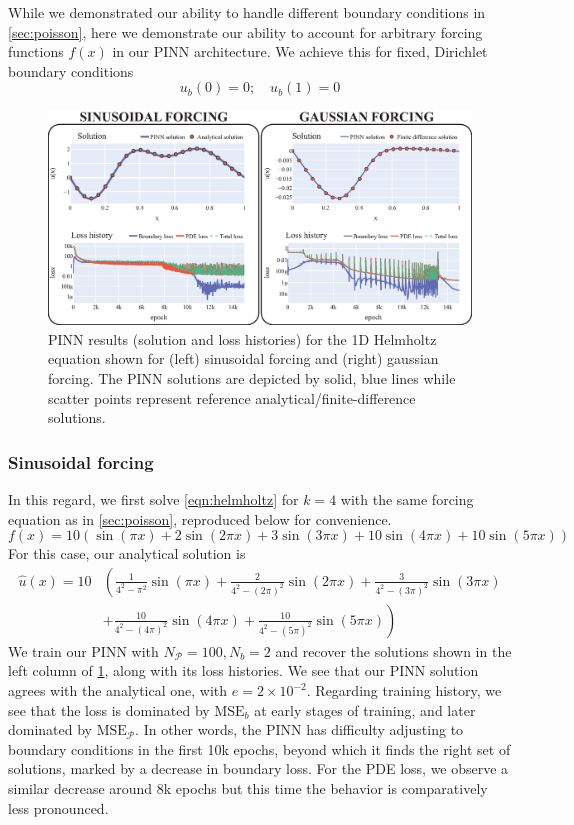 \documentclass[11pt]{article}
\newcommand{\mse}{\textrm{MSE}}
\newcommand{\pde}{\ensuremath{\mathcal{P}}}
\begin{document}
While we demonstrated our ability to handle different boundary conditions in
\cref{sec:poisson}, here we demonstrate our ability to account for arbitrary forcing
functions \(f(x)\) in our PINN architecture. We achieve this for fixed, Dirichlet
boundary conditions
\[ u_b(0) = 0;\quad  u_b(1) = 0\]

\begin{figure}[htbp]
\centering
\includegraphics[width=1.0\textwidth]{images/helmholtz.eps}
\caption{\label{fig:helmholtz_results}PINN results (solution and loss histories) for the 1D Helmholtz equation shown for (left) sinusoidal forcing and (right) gaussian forcing. The PINN solutions are depicted by solid, blue lines while scatter points represent reference analytical/finite-difference solutions.}
\end{figure}
\subsubsection{Sinusoidal forcing}
\label{sec:org4f447b3}
In this regard, we first solve \cref{eqn:helmholtz} for \(k = 4\) with the
same forcing equation as in \cref{sec:poisson}, reproduced below for convenience.
\[ f(x) = 10 \left(\sin(\pi x) + 2\sin(2\pi x) + 3\sin(3\pi x) + 10\sin(4\pi
   x) + 10\sin(5\pi x)\right) \]
For this case, our analytical solution is
\begin{equation}
\begin{split}
  \hat{u}(x) = 10 &\left(\frac{1}{4^2 - \pi^2}\sin(\pi x) + \frac{2}{4^2 -
	 \left(2\pi\right)^2}\sin(2\pi x) + \frac{3}{4^2 -
   \left(3\pi\right)^2}\sin(3\pi x) \right. \\
 & \left. + \frac{10}{4^2 - \left(4\pi\right)^2} \sin(4\pi
   x) + \frac{10}{4^2 - \left(5\pi\right)^2}\sin(5\pi x) \right)
\end{split}
\end{equation}
We train our PINN with \(N_\pde = 100 , N_b = 2\) and recover the solutions
shown in the left column of \cref{fig:helmholtz_results}, along with its loss
histories. We see that our PINN solution agrees with the analytical one,
with \(e = 2 \times 10^{-2}\). Regarding training history, we see that the
loss is dominated by \(\mse_b\) at early stages of training, and later
dominated by \(\mse_\pde\). In other words, the PINN
has difficulty adjusting to boundary conditions in the first 10k epochs,
beyond which it finds the right set of solutions, marked by a decrease in
boundary loss. For the PDE loss, we observe a similar decrease around 8k
epochs but this time the behavior is comparatively less pronounced.
\end{document}
